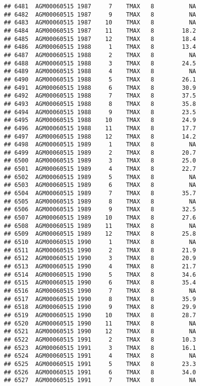 \documentclass{article}\usepackage[]{graphicx}\usepackage[]{color}
\makeatletter
\newenvironment{kframe}{%
 \def\at@end@of@kframe{}%
 \ifinner\ifhmode%
  \def\at@end@of@kframe{\end{minipage}}%
  \begin{minipage}{\columnwidth}%
 \fi\fi%
 \def\FrameCommand##1{\hskip\@totalleftmargin \hskip-\fboxsep
 \colorbox{shadecolor}{##1}\hskip-\fboxsep
     \hskip-\linewidth \hskip-\@totalleftmargin \hskip\columnwidth}%
 \MakeFramed {\advance\hsize-\width
   \@totalleftmargin\z@ \linewidth\hsize
   \@setminipage}}%
 {\par\unskip\endMakeFramed%
 \at@end@of@kframe}
\newenvironment{knitrout}{}{} %
\makeatother
\begin{document}
\begin{knitrout}
\begin{kframe}
\begin{verbatim}
## 6481  AGM00060515 1987     7    TMAX   8          NA
## 6482  AGM00060515 1987     9    TMAX   8          NA
## 6483  AGM00060515 1987    10    TMAX   8          NA
## 6484  AGM00060515 1987    11    TMAX   8        18.2
## 6485  AGM00060515 1987    12    TMAX   8        18.4
## 6486  AGM00060515 1988     1    TMAX   8        13.4
## 6487  AGM00060515 1988     2    TMAX   8          NA
## 6488  AGM00060515 1988     3    TMAX   8        24.5
## 6489  AGM00060515 1988     4    TMAX   8          NA
## 6490  AGM00060515 1988     5    TMAX   8        26.1
## 6491  AGM00060515 1988     6    TMAX   8        30.9
## 6492  AGM00060515 1988     7    TMAX   8        37.5
## 6493  AGM00060515 1988     8    TMAX   8        35.8
## 6494  AGM00060515 1988     9    TMAX   8        23.5
## 6495  AGM00060515 1988    10    TMAX   8        24.9
## 6496  AGM00060515 1988    11    TMAX   8        17.7
## 6497  AGM00060515 1988    12    TMAX   8        14.2
## 6498  AGM00060515 1989     1    TMAX   8          NA
## 6499  AGM00060515 1989     2    TMAX   8        20.7
## 6500  AGM00060515 1989     3    TMAX   8        25.0
## 6501  AGM00060515 1989     4    TMAX   8        22.7
## 6502  AGM00060515 1989     5    TMAX   8          NA
## 6503  AGM00060515 1989     6    TMAX   8          NA
## 6504  AGM00060515 1989     7    TMAX   8        35.7
## 6505  AGM00060515 1989     8    TMAX   8          NA
## 6506  AGM00060515 1989     9    TMAX   8        32.5
## 6507  AGM00060515 1989    10    TMAX   8        27.6
## 6508  AGM00060515 1989    11    TMAX   8          NA
## 6509  AGM00060515 1989    12    TMAX   8        25.8
## 6510  AGM00060515 1990     1    TMAX   8          NA
## 6511  AGM00060515 1990     2    TMAX   8        21.9
## 6512  AGM00060515 1990     3    TMAX   8        20.9
## 6513  AGM00060515 1990     4    TMAX   8        21.7
## 6514  AGM00060515 1990     5    TMAX   8        34.6
## 6515  AGM00060515 1990     6    TMAX   8        35.4
## 6516  AGM00060515 1990     7    TMAX   8          NA
## 6517  AGM00060515 1990     8    TMAX   8        35.9
## 6518  AGM00060515 1990     9    TMAX   8        29.9
## 6519  AGM00060515 1990    10    TMAX   8        28.7
## 6520  AGM00060515 1990    11    TMAX   8          NA
## 6521  AGM00060515 1990    12    TMAX   8          NA
## 6522  AGM00060515 1991     2    TMAX   8        10.3
## 6523  AGM00060515 1991     3    TMAX   8        16.1
## 6524  AGM00060515 1991     4    TMAX   8          NA
## 6525  AGM00060515 1991     5    TMAX   8        23.3
## 6526  AGM00060515 1991     6    TMAX   8        34.0
## 6527  AGM00060515 1991     7    TMAX   8          NA

\end{verbatim}
\end{kframe}
\end{knitrout}
\end{document}
